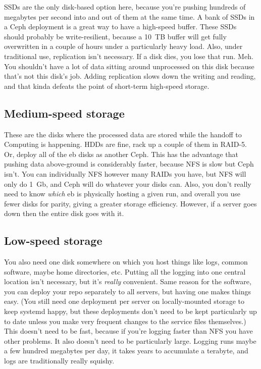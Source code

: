 SSDs are the only disk-based option here, because you're pushing hundreds of megabytes per second into and out of them at the same time.
A bank of SSDs in a Ceph deployment is a great way to have a high-speed buffer.
These SSDs should probably be write-resilient, because a 10~TB buffer will get fully overwritten in a couple of hours under a particularly heavy load.
Also, under traditional use, replication isn't necessary.
If a disk dies, you lose that run.
Meh.
You shouldn't have a lot of data sitting around unprocessed on this disk because that's not this disk's job.
Adding replication slows down the writing and reading, and that kinda defeats the point of short-term high-speed storage.

\subsection{Medium-speed storage}

These are the disks where the processed data are stored while the handoff to Computing is happening.
HDDs are fine, rack up a couple of them in RAID-5.
Or, deploy all of the eb disks as another Ceph.
This has the advantage that pushing data above-ground is considerably faster, because NFS is slow but Ceph isn't.
You can individually NFS however many RAIDs you have, but NFS will only do 1~Gb, and Ceph will do whatever your disks can.
Also, you don't really need to know \emph{which} eb is physically hosting a given run, and overall you use fewer disks for parity, giving a greater storage efficiency.
However, if a server goes down then the entire disk goes with it.

\subsection{Low-speed storage}

You also need one disk somewhere on which you host things like logs, common software, maybe home directories, etc.
Putting all the logging into one central location isn't necessary, but it's \emph{really} convenient.
Same reason for the software, you can deploy your repo separately to all servers, but having one makes things easy.
(You still need one deployment per server on locally-mounted storage to keep systemd happy, but these deployments don't need to be kept particularly up to date unless you make very frequent changes to the service files themselves.)
This doesn't need to be fast, because if you're logging faster than NFS you have other problems.
It also doesn't need to be particularly large.
Logging runs maybe a few hundred megabytes per day, it takes years to accumulate a terabyte, and logs are traditionally really squishy.

